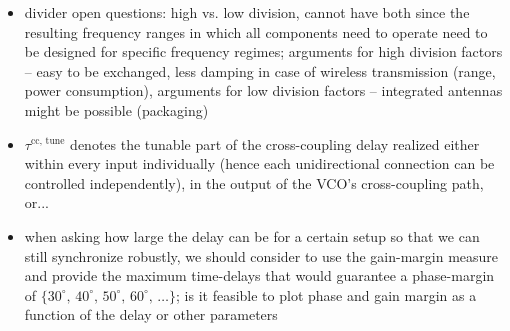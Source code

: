 \documentclass{article}
\begin{document}
\begin{itemize}
 \item divider open questions: high vs. low division, cannot have both since the resulting frequency ranges in which all components need to operate need to be designed for specific frequency regimes; arguments for high division factors -- easy to be exchanged, less damping in case of wireless transmission (range, power consumption), arguments for low division factors -- integrated antennas might be possible (packaging)
 \item $\tau^\textrm{cc, tune}$ denotes the tunable part of the cross-coupling delay realized either within every input individually (hence each unidirectional connection can be controlled independently), in the output of the VCO's cross-coupling path, or... 
 \item when asking how large the delay can be for a certain setup so that we can still synchronize robustly, we should consider to use the gain-margin measure and provide the maximum time-delays that would guarantee a phase-margin of $\{30^\circ,\,40^\circ,\,50^\circ,\,60^\circ,\,\dots\}$; is it feasible to plot phase and gain margin as a function of the delay or other parameters
\end{itemize}




\end{document}
